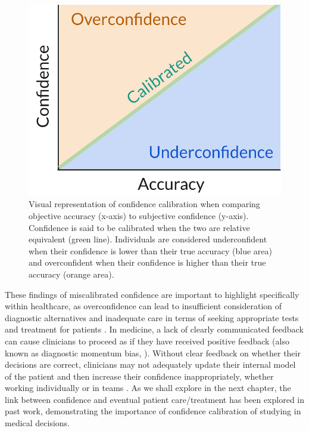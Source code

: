 \documentclass[a4paper, nobind]{templates/ociamthesis}
\begin{document}
\begin{figure}[H]

{\centering \includegraphics[width=1\linewidth]{./assets/confidenceCalibration} 

}

\caption[Visual representation of confidence calibration]{Visual representation of confidence calibration when comparing objective accuracy (x-axis) to subjective confidence (y-axis). Confidence is said to be calibrated when the two are relative equivalent (green line). Individuals are considered underconfident when their confidence is lower than their true accuracy (blue area) and overconfident when their confidence is higher than their true accuracy (orange area).}\label{fig:calibrationgraph}
\end{figure}

These findings of miscalibrated confidence are important to highlight specifically within healthcare, as overconfidence can lead to insufficient consideration of diagnostic alternatives and inadequate care in terms of seeking appropriate tests and treatment for patients \autocite{kovacs_overconfident_2020}. In medicine, a lack of clearly communicated feedback can cause clinicians to proceed as if they have received positive feedback (also known as diagnostic momentum bias, \textcite{aron_diagnostic_2024}). Without clear feedback on whether their decisions are correct, clinicians may not adequately update their internal model of the patient and then increase their confidence inappropriately, whether working individually or in teams \autocite{jaspan_improving_2022}. As we shall explore in the next chapter, the link between confidence and eventual patient care/treatment has been explored in past work, demonstrating the importance of confidence calibration of studying in medical decisions.
\end{document}
